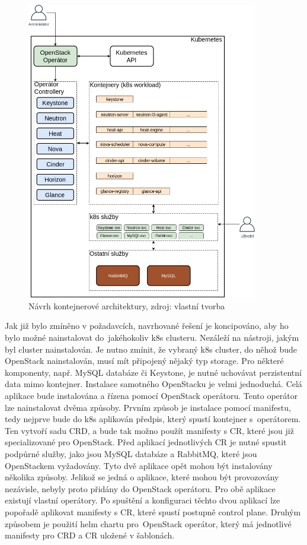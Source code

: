 \begin{figure}[H]
\begin{centering}
\includegraphics[width=0.9\textwidth]{img/openstack_operator.png}
\par\end{centering}
\caption{Návrh kontejnerové architektury, zdroj: vlastní tvorba} \label{fig:openstack_operator}
\end{figure}

Jak již bylo zmíněno v požadavcích, navrhované řešení je koncipováno, aby ho bylo možné nainstalovat do jakéhokoliv k8s clusteru. Nezáleží na nástroji, jakým byl cluster nainstalován. Je nutno zmínit, že vybraný k8s cluster, do něhož bude OpenStack nainstalován, musí mít připojený nějaký typ storage. Pro některé komponenty, např. MySQL databáze či Keystone, je nutné uchovávat perzistentní data mimo kontejner. Instalace samotného OpenStacku je velmi jednoduchá. Celá aplikace bude instalována a řízena pomocí OpenStack operátoru. Tento operátor lze nainstalovat dvěma způsoby. Prvním způsob je instalace pomocí manifestu, tedy nejprve bude do k8s aplikován předpis, který spustí kontejner s operátorem. Ten vytvoří sadu CRD, a bude tak možno použít manifesty s CR, které jsou již specializované pro OpenStack. Před aplikací jednotlivých CR je nutné spustit podpůrné služby, jako jsou MySQL databáze a RabbitMQ, které jsou OpenStackem vyžadovány. Tyto dvě aplikace opět mohou být instalovány několika způsoby. Jelikož se jedná o aplikace, které mohou být provozovány nezávisle, nebyly proto přidány do OpenStack operátoru. Pro obě aplikace existují vlastní operátory. Po spuštění a konfiguraci těchto dvou aplikací lze popořadě aplikovat manifesty s CR, které spustí postupně control plane. Druhým způsobem je použití helm chartu pro OpenStack operátor, který má jednotlivé manifesty pro CRD a CR uložené v šablonách.
